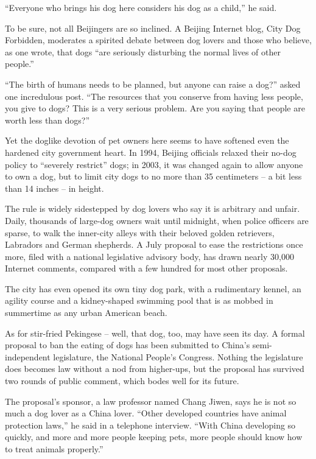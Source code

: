﻿\documentclass[12pt]{article}
\begin{document}
``Everyone who brings his dog here considers his dog as a child,'' he said.

To be sure, not all Beijingers are so inclined. A Beijing Internet blog, City Dog Forbidden,
moderates a spirited debate between dog lovers and those who believe, as one wrote, that dogs ``are
seriously disturbing the normal lives of other people.''

``The birth of humans needs to be planned, but anyone can raise a dog?'' asked one incredulous post.
``The resources that you conserve from having less people, you give to dogs? This is a very serious
problem. Are you saying that people are worth less than dogs?''

Yet the doglike devotion of pet owners here seems to have softened even the hardened city government
heart. In 1994, Beijing officials relaxed their no-dog policy to ``severely restrict'' dogs; in
2003, it was changed again to allow anyone to own a dog, but to limit city dogs to no more than 35
centimeters -- a bit less than 14 inches -- in height.

The rule is widely sidestepped by dog lovers who say it is arbitrary and unfair. Daily, thousands of
large-dog owners wait until midnight, when police officers are sparse, to walk the inner-city alleys
with their beloved golden retrievers, Labradors and German shepherds. A July proposal to ease the
restrictions once more, filed with a national legislative advisory body, has drawn nearly 30,000
Internet comments, compared with a few hundred for most other proposals.

The city has even opened its own tiny dog park, with a rudimentary kennel, an agility course and a
kidney-shaped swimming pool that is as mobbed in summertime as any urban American beach.

As for stir-fried Pekingese -- well, that dog, too, may have seen its day. A formal proposal to ban
the eating of dogs has been submitted to China's semi-independent legislature, the National People's
Congress. Nothing the legislature does becomes law without a nod from higher-ups, but the proposal
has survived two rounds of public comment, which bodes well for its future.

The proposal's sponsor, a law professor named Chang Jiwen, says he is not so much a dog lover as a
China lover. ``Other developed countries have animal protection laws,'' he said in a telephone
interview. ``With China developing so quickly, and more and more people keeping pets, more people
should know how to treat animals properly.''
\end{document}
